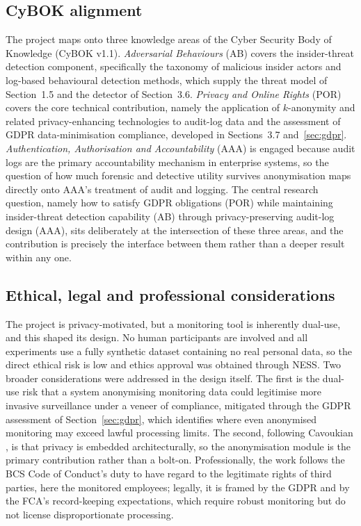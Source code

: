 \documentclass[10pt,a4paper]{article}
\begin{document}
\subsection{CyBOK alignment}
\label{sec:cybok}
The project maps onto three knowledge areas of the Cyber Security Body of Knowledge (CyBOK v1.1). \emph{Adversarial Behaviours} (AB) covers the insider-threat detection component, specifically the taxonomy of malicious insider actors and log-based behavioural detection methods, which supply the threat model of Section~1.5 and the detector of Section~3.6. \emph{Privacy and Online Rights} (POR) covers the core technical contribution, namely the application of $k$-anonymity and related privacy-enhancing technologies to audit-log data and the assessment of GDPR data-minimisation compliance, developed in Sections~3.7 and~\ref{sec:gdpr}. \emph{Authentication, Authorisation and Accountability} (AAA) is engaged because audit logs are the primary accountability mechanism in enterprise systems, so the question of how much forensic and detective utility survives anonymisation maps directly onto AAA's treatment of audit and logging. The central research question, namely how to satisfy GDPR obligations (POR) while maintaining insider-threat detection capability (AB) through privacy-preserving audit-log design (AAA), sits deliberately at the intersection of these three areas, and the contribution is precisely the interface between them rather than a deeper result within any one.

\subsection{Ethical, legal and professional considerations}
The project is privacy-motivated, but a monitoring tool is inherently dual-use, and this shaped its design. No human participants are involved and all experiments use a fully synthetic dataset containing no real personal data, so the direct ethical risk is low and ethics approval was obtained through NESS. Two broader considerations were addressed in the design itself. The first is the dual-use risk that a system anonymising monitoring data could legitimise more invasive surveillance under a veneer of compliance, mitigated through the GDPR assessment of Section~\ref{sec:gdpr}, which identifies where even anonymised monitoring may exceed lawful processing limits. The second, following Cavoukian \cite{cavoukian2011}, is that privacy is embedded architecturally, so the anonymisation module is the primary contribution rather than a bolt-on. Professionally, the work follows the BCS Code of Conduct's duty to have regard to the legitimate rights of third parties, here the monitored employees; legally, it is framed by the GDPR and by the FCA's record-keeping expectations, which require robust monitoring but do not license disproportionate processing.
\end{document}
